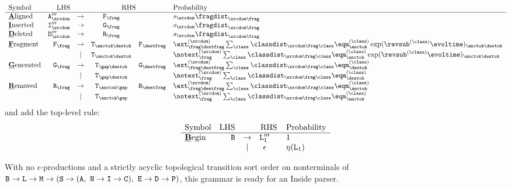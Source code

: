 \[
\begin{array}{lrcccl}
\mbox{Symbol} & \mbox{LHS} & & \multicolumn{2}{c}{\mbox{RHS}} & \mbox{Probability} \\
\hline
\mbox{\underline{\bf A}ligned} & \ntaln'''_\srcdom & \to & \ntfrag_\frag & & \tok_\srcdom \fragdist_{\srcdom\frag} \\
\mbox{\underline{\bf I}nserted} & \ntins'''_\srcdom & \to & \ntgen_\frag & & \tok_\srcdom \fragdist_{\srcdom\frag} \\
\mbox{\underline{\bf D}eleted} & \ntdel'''_\srcdom & \to & \ntrem_\frag & & \tok_\srcdom \fragdist_{\srcdom\frag} \\
\mbox{\underline{\bf F}ragment} & \ntfrag_\frag & \to & \term_{\anctok\destok} & \ntfrag_\destfrag & \ext^{(\srcdom)}_{\frag\destfrag} \sum_\class \classdist_{\srcdom\frag\class} \eqm^{(\class)}_\anctok \exp(\revsub^{(\class)} \evoltime)_{\anctok\destok}\\
& & | & \term_{\anctok\destok} & & \notext^{(\srcdom)}_\frag \sum_\class \classdist_{\srcdom\frag\class} \eqm^{(\class)}_\anctok \exp(\revsub^{(\class)} \evoltime)_{\anctok\destok} \\
\mbox{\underline{\bf G}enerated} & \ntgen_\frag & \to & \term_{\gap\destok} & \ntgen_\destfrag & \ext^{(\srcdom)}_{\frag\destfrag} \sum_\class \classdist_{\srcdom\frag\class} \eqm^{(\class)}_\destok \\
& & | & \term_{\gap\destok} & & \notext^{(\srcdom)}_\frag \sum_\class \classdist_{\srcdom\frag\class} \eqm^{(\class)}_\destok \\
\mbox{\underline{\bf R}emoved} & \ntrem_\frag & \to & \term_{\anctok\gap} & \ntrem_\destfrag & \ext^{(\srcdom)}_{\frag\destfrag} \sum_\class \classdist_{\srcdom\frag\class} \eqm^{(\class)}_\anctok \\
& & | & \term_{\anctok\gap} & & \notext^{(\srcdom)}_\frag \sum_\class \classdist_{\srcdom\frag\class} \eqm^{(\class)}_\anctok \\
\end{array}
\]
and add the top-level rule:
\[
\begin{array}{lrcccl}
\mbox{Symbol} & \mbox{LHS} & & \multicolumn{2}{c}{\mbox{RHS}} & \mbox{Probability} \\
\hline
\mbox{\underline{\bf B}egin} & \ntbegin & \to & \ntlinks'''_1 & & 1 \\
& & | & \epsilon & & \nullability(\ntlinks_1) \\
\end{array}
\]

With no $\epsilon$-productions and a strictly acyclic topological transition sort order on nonterminals
of ${\tt B} \to {\tt L} \to {\tt M} \to ( {\tt S} \to ({\tt A},\ {\tt N} \to {\tt I} \to {\tt C}),\ {\tt E} \to {\tt D} \to {\tt P})$,
this grammar is ready for an Inside parser.

